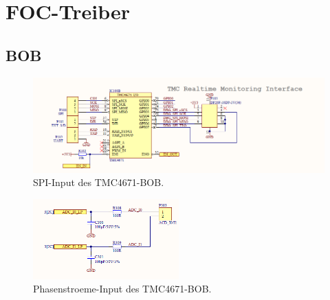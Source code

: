 \section{FOC-Treiber}\label{Appendix:TMC4671}

%

\subsection{BOB}\label{Appendix:BOB}

\begin{figure}[H]
	\centering
	\includegraphics[width=\textwidth]{graphics/TMC4671_SPI_BOB_Schematic}
	\caption{SPI-Input des TMC4671-BOB. \cite[S.2]{trinamicmotion_control_gmbh__co_kg_tmc4671-bob_2020}}
	\label{fig:Schema_SPI_FOC_Treiber}
\end{figure} 

\begin{figure}[H]
	\centering
	\includegraphics[width=0.5\textwidth]{graphics/TMC4671_Phasenstroeme_BOB_Schematic}
	\caption{Phasenstroeme-Input des TMC4671-BOB. \cite[S.4]{trinamicmotion_control_gmbh__co_kg_tmc4671-bob_2020}}
	\label{fig:Schema_Phasenstroeme_FOC_Treiber}
\end{figure} 

